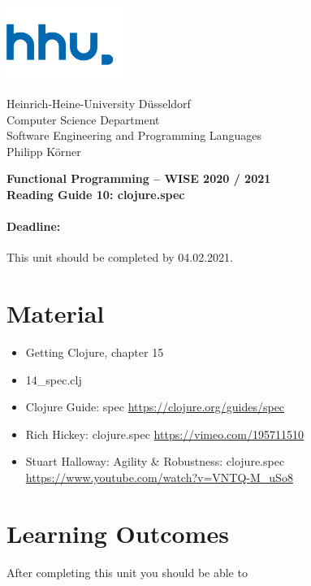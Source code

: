 \documentclass[11pt,a4paper]{article}
\begin{document}
\begin{minipage}[b]{\textwidth}
	\parbox[t]{5cm}{%
		\includegraphics[width=4cm]{unilogo}
		\hfill
	}
	\parbox[b]{11cm}{%
		Heinrich-Heine-University D\"usseldorf\\
		Computer Science Department\\
		Software Engineering and Programming Languages\\
		Philipp K\"orner
	}
\end{minipage}
\begin{center}
	\bf
	Functional Programming -- WISE 2020 / 2021\\
	Reading Guide 10: clojure.spec
\end{center}

\pagestyle{empty}

\paragraph{Deadline:} This unit should be completed by 04.02.2021.

\section{Material} 

\begin{itemize}
    \item Getting Clojure, chapter 15
	\item 14\_spec.clj
	\item Clojure Guide: spec \url{https://clojure.org/guides/spec}
	\item Rich Hickey: clojure.spec \url{https://vimeo.com/195711510}
	\item Stuart Halloway: Agility \& Robustness: clojure.spec \url{https://www.youtube.com/watch?v=VNTQ-M_uSo8}
\end{itemize}


\section{Learning Outcomes}

After completing this unit you should be able to
\end{document}
